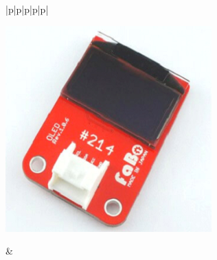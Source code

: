 \begin{table}[H]
\begin{tabular}{|p{\colA}|p{\colB}|p{\colC}|p{\colD}|p{\colE}|}
    \begin{minipage}[t]{\linewidth}
    \smallskip
      \centering
      \includegraphics[width=0.8\linewidth]{images/chap05/text05-img025.png}
      \smallskip
    \end{minipage} &
    \pageref{oled}\\ \hline
    \end{tabular}
\end{table}
